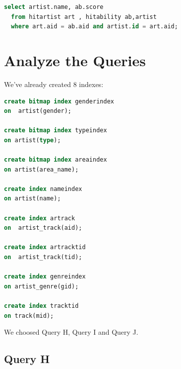 \documentclass[11pt]{article} %
\begin{document}
{\begin{lstlisting}[language=SQL, keywordstyle=\color{blue!70},
commentstyle=\color{red!50!green!50!blue!50},
rulesepcolor=\color{red!20!green!20!blue!20},
frame=shadowbox]
select artist.name, ab.score
  from hitartist art , hitability ab,artist
  where art.aid = ab.aid and artist.id = art.aid;

\end{lstlisting}

\section{Analyze the Queries}

We've already created 8 indexes:\\
\begin{lstlisting}[language=SQL, keywordstyle=\color{blue!70},
commentstyle=\color{red!50!green!50!blue!50},
rulesepcolor=\color{red!20!green!20!blue!20},
frame=shadowbox]
create bitmap index genderindex
on  artist(gender); 

create bitmap index typeindex
on artist(type);

create bitmap index areaindex
on artist(area_name);

create index nameindex
on artist(name);

create index artrack
on  artist_track(aid);

create index artracktid
on  artist_track(tid);

create index genreindex
on artist_genre(gid);

create index tracktid
on track(mid);
\end{lstlisting}

We choosed Query H, Query I and Query J.

\subsection{Query H}

}
\end{document}

